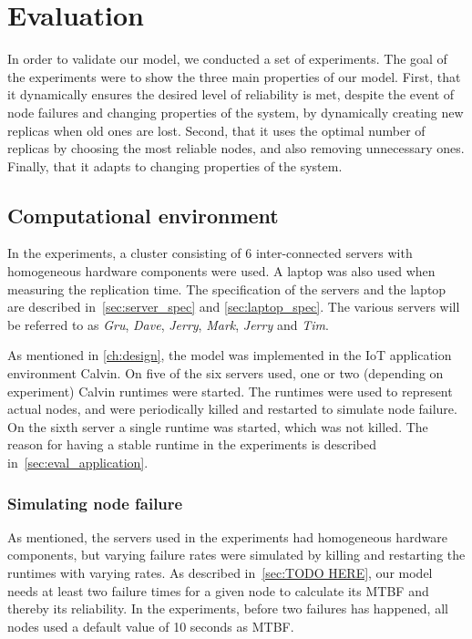 \documentclass{cslthse-msc}
\begin{document}
\chapter{Evaluation} \label{ch:evaluation}
In order to validate our model, we conducted a set of experiments. The goal of the experiments were to show the three main properties of our model. First, that it dynamically ensures the desired level of reliability is met, despite the event of node failures and changing properties of the system, by dynamically creating new replicas when old ones are lost. Second, that it uses the optimal number of replicas by choosing the most reliable nodes, and also removing unnecessary ones. Finally, that it adapts to changing properties of the system.

\section{Computational environment} \label{sec:eval_comp_env}
In the experiments, a cluster consisting of 6 inter-connected servers with homogeneous hardware components were used. A laptop was also used when measuring the replication time. The specification of the servers and the laptop are described in~\cref{sec:server_spec} and \cref{sec:laptop_spec}. The various servers will be referred to as \emph{Gru}, \emph{Dave}, \emph{Jerry}, \emph{Mark}, \emph{Jerry} and \emph{Tim}.

As mentioned in \cref{ch:design}, the model was implemented in the IoT application environment Calvin. On five of the six servers used, one or two (depending on experiment) Calvin runtimes were started. The runtimes were used to represent actual nodes, and were periodically killed and restarted to simulate node failure. On the sixth server a single runtime was started, which was not killed. The reason for having a stable runtime in the experiments is described in~\cref{sec:eval_application}.

\subsection{Simulating node failure} \label{sec:simulating_node_failure}
As mentioned, the servers used in the experiments had homogeneous hardware components, but varying failure rates were simulated by killing and restarting the runtimes with varying rates. As described in~\cref{sec:TODO HERE}, our model needs at least two failure times for a given node to calculate its MTBF and thereby its reliability. In the experiments, before two failures has happened, all nodes used a default value of 10 seconds as MTBF.
\end{document}
